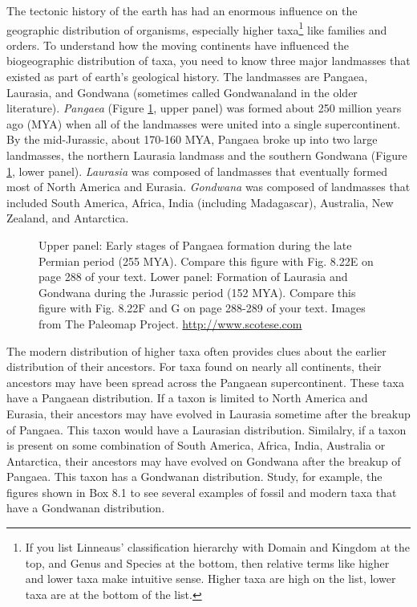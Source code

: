 \documentclass[11pt, oneside]{article}   	%
\begin{document}
The tectonic history of the earth has had an enormous influence on the geographic distribution of organisms, especially higher taxa\footnote{If you list Linneaus' classification hierarchy with Domain and Kingdom at the top, and Genus and Species at the bottom, then relative terms like higher and lower taxa make intuitive sense. Higher taxa are high on the list, lower taxa are at the bottom of the list.} like families and orders. To understand how the moving continents have influenced the biogeographic distribution of taxa, you need to know three major landmasses that existed as part of earth's geological history. The landmasses are Pangaea, Laurasia, and Gondwana (sometimes called Gondwanaland in the older literature). \emph{Pangaea} (Figure \ref{Pangaea}, upper panel) was formed about 250 million years ago (MYA) when all of the landmasses were united into a single supercontinent. By the mid-Jurassic, about 170-160 MYA, Pangaea broke up into two large landmasses, the northern Laurasia landmass and the southern Gondwana (Figure \ref{Pangaea}, lower panel). \emph{Laurasia} was composed of landmasses that eventually formed most of North America and Eurasia. \emph{Gondwana} was composed of landmasses that included South America, Africa, India (including Madagascar), Australia, New Zealand, and Antarctica.

\begin{figure}[tbp]
	\centering
		\caption{Upper panel: Early stages of Pangaea formation during the late Permian period (255 MYA). Compare this figure with Fig. 8.22E on page 288 of your text. Lower panel: Formation of Laurasia and Gondwana during the Jurassic period (152 MYA). Compare this figure with Fig. 8.22F and G on page 288-289 of your text. Images from The Paleomap Project. \url{http://www.scotese.com} \label{Pangaea}}
		
\end{figure}

The modern distribution of higher taxa often provides clues about the earlier distribution of their ancestors. For taxa found on nearly all continents, their ancestors may have been spread across the Pangaean supercontinent. These taxa have a Pangaean distribution. If a taxon is limited to North America and Eurasia, their ancestors may have evolved in Laurasia sometime after the breakup of Pangaea. This taxon would have a Laurasian distribution. Similalry, if a taxon is present on some combination of South America, Africa, India, Australia or Antarctica, their ancestors may have evolved on Gondwana after the breakup of Pangaea. This taxon has a Gondwanan distribution. Study, for example, the figures shown in Box 8.1 to see several examples of fossil and modern taxa that have a Gondwanan distribution. 
\end{document}
